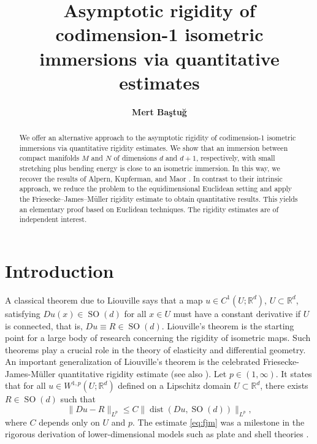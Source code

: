 \documentclass{article}
\title{\textbf{Asymptotic rigidity of codimension-1 isometric immersions via quantitative estimates}}
\author{\textbf{Mert Baştuğ}}
\date{}
\numberwithin{equation}{section}
\theoremstyle{definition}
\theoremstyle{remark}
\DeclareMathOperator{\dist}{dist}
\DeclareMathOperator{\SO}{SO}
\begin{document}
\maketitle

\begin{abstract}
    We offer an alternative approach to the asymptotic rigidity of codimension-1 isometric immersions via quantitative rigidity estimates. We show that an immersion between compact manifolds $M$ and $N$ of dimensions $d$ and $d + 1$, respectively, with small stretching plus bending energy is close to an isometric immersion. In this way, we recover the results of Alpern, Kupferman, and Maor \cite{AKM, AKM2}. In contrast to their intrinsic approach, we reduce the problem to the equidimensional Euclidean setting and apply the Friesecke–James–Müller \cite{FJM} rigidity estimate to obtain quantitative results. This yields an elementary proof based on Euclidean techniques. The rigidity estimates are of independent interest.
\end{abstract}

\section{Introduction}

A classical theorem due to Liouville says that a map $u \in C^1(U; \mathbb{R}^d)$, $U \subset \mathbb{R}^d$, satisfying $Du(x) \in \SO(d)$ for all $x \in U$ must have a constant derivative if $U$ is connected, that is, $Du \equiv R \in \SO(d)$. Liouville's theorem is the starting point for a large body of research concerning the rigidity of isometric maps. Such theorems play a crucial role in the theory of elasticity and differential geometry. An important generalization of Liouville's theorem is the celebrated Friesecke-James-Müller quantitative rigidity estimate \cite{FJM} (see also \cite[Section 2.4]{CS}). Let $p \in (1, \infty)$. It states that for all $u \in W^{1, p}(U; \mathbb{R}^d)$ defined on a Lipschitz domain $U \subset \mathbb{R}^d$, there exists $R \in \SO(d)$ such that
\begin{equation} \label{eq:fjm}
    \|Du - R\|_{L^p} \le C \|\dist(Du, \SO(d))\|_{L^p},
\end{equation}
where $C$ depends only on $U$ and $p$. The estimate \eqref{eq:fjm} was a milestone in the rigorous derivation of lower-dimensional models such as plate and shell theories \cite{FJMM, FJM, FJM2, MS}.
\end{document}
